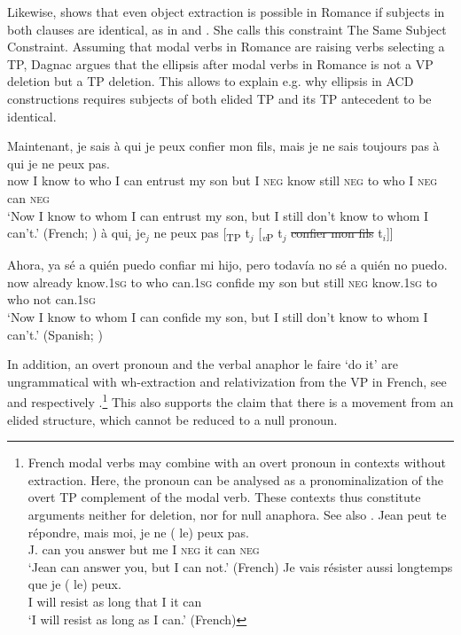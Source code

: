 \documentclass[output=paper,colorlinks,citecolor=brown,
modfonts
]{langscibook}
\begin{document}
\noindent Likewise, \cite{Dagnac2010} shows that even object extraction is possible in Romance if subjects in both clauses are identical, as in  and . She calls this constraint The Same Subject Constraint. Assuming that modal verbs in Romance are raising verbs selecting a TP, Dagnac argues that the ellipsis after modal verbs in Romance is not a VP deletion but a TP deletion. This allows to explain e.g. why ellipsis in ACD constructions requires subjects of both elided TP and its TP antecedent to be identical.

\begin{exe}
\ex \label{8} 
\begin{xlist}
\ex \label{8a}\gll Maintenant, je sais à qui je peux confier mon fils, mais je ne sais toujours pas  à qui je ne peux pas. \\
now I know to who I can entrust my son but I \textsc{neg} know still \textsc{neg} to who I \textsc{neg} can \textsc{neg} \\
\glt `Now I know to whom I can entrust my son, but I still don't know to whom I can't.'	\hfill (French; \citealt{Dagnac2010})
\ex {\ldots}{} à qui$_{i}$ je$_{j}$  ne peux pas [\textsubscript{TP} t$_{j}$ [\textsubscript{\textit{v}P} t$_{j}$  \sout{confier mon fils} t$_{i}$]]
\end{xlist} 

\ex \label{9} 
\gll Ahora, ya sé a quién puedo confiar mi hijo, pero todavía no sé a quién no puedo.\\
now already know.\textsc{1sg} to who can.\textsc{1sg} confide my son but still \textsc{neg} know.\textsc{1sg} to who not can.\textsc{1sg}\\
\glt `Now I know to whom I can confide my son, but I still don't know to whom I can't.' \hfill (Spanish; \citealt{Dagnac2010})
\end{exe}

\noindent In addition, an overt pronoun and the verbal anaphor le faire `do it' are ungrammatical with wh-extraction and relativization from the VP in French, see  and  respectively \citep{Dagnac2008}.\footnote{French modal verbs may combine with an overt pronoun in contexts without extraction. Here, the pronoun can be analysed as a pronominalization of the overt TP complement of the modal verb. These contexts thus constitute arguments neither for deletion, nor for null anaphora. See also .
\ea \gll Jean peut te répondre, mais moi, je ne (\hspace{-2pt} le) peux pas.\\
J. can  you answer  but me  I  \textsc{neg} {} it can  \textsc{neg} \\
\glt `Jean can answer you, but I can not.' \hfill (French)\z 
\ea \gll Je vais résister aussi longtemps que je (\hspace{-2pt} le) peux.\\
I   will resist as   long that  I   {} it  can\\
\glt `I will resist as long as I can.' \hfill (French)\z\label{fn:3}} This also supports the claim that there is a movement from an elided structure, which cannot be reduced to a null pronoun. 
\end{document}
